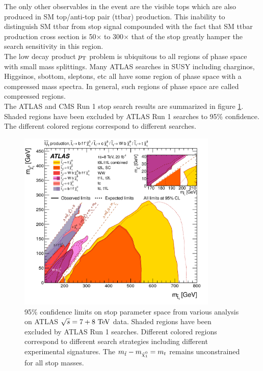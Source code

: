 \indent The only other observables in the event are the visible tops which are also produced in SM top/anti-top pair (ttbar) production.  This inability to distinguish SM ttbar from stop signal compounded with the fact that SM ttbar production cross section is 50$\times$ to 300$\times$ that of the stop greatly hamper the search sensitivity in this region. \\

\indent The low decay product $p_{\mathrm{T}}$ problem is ubiquitous to all regions of phase space with small mass splittings.  Many ATLAS searches in SUSY including charginos, Higgsinos, sbottom, sleptons, etc all have some region of phase space with a compressed mass spectra.  In general, such regions of phase space are called compressed regions. \\

\indent The ATLAS and CMS Run 1 stop search results are summarized in figure \ref{fig:ATLAS:8TeVResult}.  Shaded regions have been excluded by ATLAS Run 1 searches to 95\% confidence.  The different colored regions correspond to different searches.  \\

\begin{figure}[h!]
\centering
    \includegraphics[width=0.85\textwidth]{figures/8TeV/ATLAS_SUSY_Stop_tLSP_201507.png}\hspace{0.05\textwidth}
\caption{ 95\% confidence limits on stop parameter space from various analysis on ATLAS $\sqrt{s} = 7+8 \tev$ data.  Shaded regions have been excluded by ATLAS Run 1 searches.  Different colored regions correspond to different search strategies including different experimental signatures. The $m_{\stop}-m_{\ninoone} = m_t$ remains unconstrained for all stop masses. }
\label{fig:ATLAS:8TeVResult}
\end{figure}


